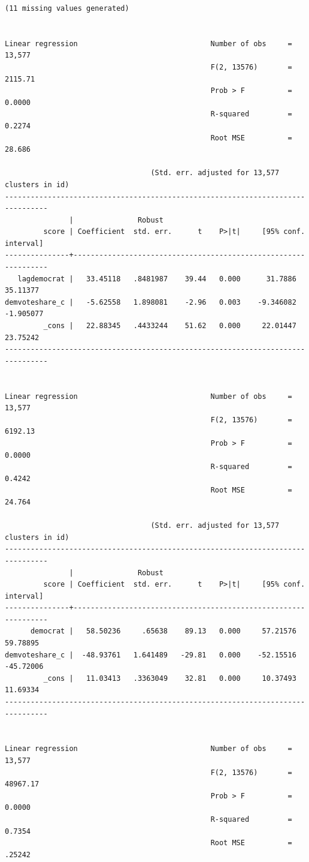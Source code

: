 \documentclass[
]{book}
\begin{document}
\begin{verbatim}
(11 missing values generated)


Linear regression                               Number of obs     =     13,577
                                                F(2, 13576)       =    2115.71
                                                Prob > F          =     0.0000
                                                R-squared         =     0.2274
                                                Root MSE          =     28.686

                                  (Std. err. adjusted for 13,577 clusters in id)
--------------------------------------------------------------------------------
               |               Robust
         score | Coefficient  std. err.      t    P>|t|     [95% conf. interval]
---------------+----------------------------------------------------------------
   lagdemocrat |   33.45118   .8481987    39.44   0.000      31.7886    35.11377
demvoteshare_c |   -5.62558   1.898081    -2.96   0.003    -9.346082   -1.905077
         _cons |   22.88345   .4433244    51.62   0.000     22.01447    23.75242
--------------------------------------------------------------------------------


Linear regression                               Number of obs     =     13,577
                                                F(2, 13576)       =    6192.13
                                                Prob > F          =     0.0000
                                                R-squared         =     0.4242
                                                Root MSE          =     24.764

                                  (Std. err. adjusted for 13,577 clusters in id)
--------------------------------------------------------------------------------
               |               Robust
         score | Coefficient  std. err.      t    P>|t|     [95% conf. interval]
---------------+----------------------------------------------------------------
      democrat |   58.50236     .65638    89.13   0.000     57.21576    59.78895
demvoteshare_c |  -48.93761   1.641489   -29.81   0.000    -52.15516   -45.72006
         _cons |   11.03413   .3363049    32.81   0.000     10.37493    11.69334
--------------------------------------------------------------------------------


Linear regression                               Number of obs     =     13,577
                                                F(2, 13576)       =   48967.17
                                                Prob > F          =     0.0000
                                                R-squared         =     0.7354
                                                Root MSE          =     .25242


\end{verbatim}
\end{document}
